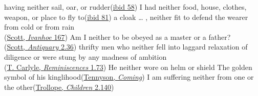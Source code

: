 \ex
having neither sail, oar, or rudder\hfill(\href{https://archive.org/details/lifeandstranges00dobsgoog/page/n83/mode/2up?q=%22having+neither%22&view=theater}{ibid 58}) 
\ex
I had neither food, house, clothes, weapon, or place to fly to\hfill(\href{https://archive.org/details/lifeandstranges00dobsgoog/page/n107/mode/2up?q=%22neither+food%22&view=theater}{ibid 81}) %
\ex
a cloak {\dots} , neither fit to defend the wearer from cold or from rain\\\hfill(\href{https://archive.org/details/scottsivanhoeedi0000amar/page/182/mode/2up?q=%22neither+fit+to+defend%22&view=theater}{Scott, \textit{Ivanhoe} 167}) %
\ex
Am I neither to be obeyed as a master or a father? \\\hfill(\href{https://archive.org/details/cewaverleynovels03scotuoft/page/378/mode/2up?view=theater&q=%22neither+to+be+obeyed+as+a+master%22}{Scott, \textit{Antiquary} 2.36}) %
\ex
thrifty men who neither fell into laggard relaxation of diligence or were stung by any madness of ambition\\\hfill(\href{https://archive.org/details/reminiscences0000thom_e9a0/page/58/mode/2up?q=%22thrifty+men%22&view=theater}{T. Carlyle, \textit{Reminiscences} 1.73}) %
\ex
He neither wore on helm or shield The golden symbol of his kinglihood\hfill(\href{https://en.wikisource.org/wiki/Idylls_of_the_King/The_Coming_of_Arthur}{Tennyson, \textit{Coming}})
\ex
I am suffering neither from one or the other\hfill(\href{https://archive.org/details/dukeschildrennov00troluoft/page/226/mode/2up?q=%22am+suffering+neither%22&view=theater}{Trollope, \textit{Children} 2.140}) %
\z
\z


